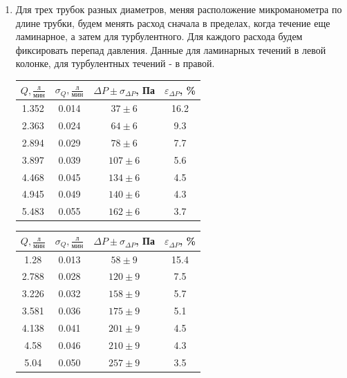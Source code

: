 \documentclass[a4paper]{article}
\begin{document}
\begin{enumerate}
\item Для трех трубок разных диаметров, меняя расположение микроманометра по длине трубки, будем менять расход сначала в пределах, когда течение еще ламинарное, а затем для турбулентного. Для каждого расхода будем фиксировать перепад давления. 
Данные для ламинарных течений в левой колонке, для турбулентных течений - в правой.
\clearpage
\begin{multicols}{2}
\begin{center}
    \begin{tabular}{|c|c|c|c|}
        \hline
        $Q, \frac{\text{л}}{\text{мин}} $& $\sigma_Q, \frac{\text{л}}{\text{мин}} $& $\Delta P \pm \sigma_{\Delta P}$, Па & $\varepsilon_{\Delta P}$, \% \\
        \hline
        1.352 & 0.014 & $37 \pm 6$ & 16.2 \\ \hline
        2.363 & 0.024 & $64 \pm 6$ & 9.3 \\ \hline
        2.894 & 0.029 & $78 \pm 6$ & 7.7 \\ \hline
        3.897 & 0.039 & $107 \pm 6$ & 5.6 \\ \hline
        4.468 & 0.045 & $134 \pm 6$ & 4.5 \\ \hline
        4.945 & 0.049 & $140 \pm 6$ & 4.3 \\ \hline
        5.483 & 0.055 & $162 \pm 6$ & 3.7 \\ \hline
    \end{tabular}
\end{center}
\vspace{1em}
\begin{center}
    \begin{tabular}{|c|c|c|c|}
        \hline
         $Q, \frac{\text{л}}{\text{мин}} $& $\sigma_Q, \frac{\text{л}}{\text{мин}} $& $\Delta P \pm \sigma_{\Delta P}$, Па & $\varepsilon_{\Delta P}$, \% \\
        \hline
        1.28 & 0.013 & $58 \pm 9$ & 15.4 \\ \hline
        2.788 & 0.028 & $120 \pm 9$ & 7.5 \\ \hline
        3.226 & 0.032 & $158 \pm 9$ & 5.7 \\ \hline
        3.581 & 0.036 & $175 \pm 9$ & 5.1 \\ \hline
        4.138 & 0.041 & $201 \pm 9$ & 4.5 \\ \hline
        4.58 & 0.046 & $210 \pm 9$ & 4.3 \\ \hline
        5.04 & 0.050 & $257 \pm 9$ & 3.5 \\ \hline

\end{tabular}
\end{center}
\end{multicols}
\end{enumerate}
\end{document}
